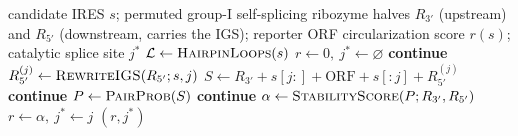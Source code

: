 \documentclass[11pt]{article}
\begin{document}
\begin{algorithm}[H]
\caption{Ribozyme-mediated circularization scoring of a candidate IRES}
\label{alg:fsl}
\begin{algorithmic}[1]
\REQUIRE candidate IRES $s$; permuted group-I self-splicing ribozyme halves
$R_{3'}$ (upstream) and $R_{5'}$ (downstream, carries the IGS); reporter ORF
\ENSURE circularization score $r(s)$; catalytic splice site $j^\ast$
\STATE $\mathcal{L} \gets \textsc{HairpinLoops}(s)$ 
\STATE $r \gets 0,\ j^\ast \gets \varnothing$
  \STATE \textbf{continue}
  \ENDIF
  \STATE $R_{5'}^{(j)} \gets \textsc{RewriteIGS}(R_{5'}; s, j)$ 
  \STATE $S \gets R_{3'} + s[j:] + \mathrm{ORF} + s[:j] + R_{5'}^{(j)}$ 
  \STATE \textbf{continue}
  \ENDIF
  \STATE $P \gets \textsc{PairProb}(S)$ 
  \STATE \textbf{continue}
  \ENDIF
  \STATE $\alpha \gets \textsc{StabilityScore}(P; R_{3'}, R_{5'})$
  \STATE $r \gets \alpha,\ j^\ast \gets j$
  \ENDIF
\ENDFOR
\RETURN $(r, j^\ast)$
\end{algorithmic}
\end{algorithm}
\end{document}
